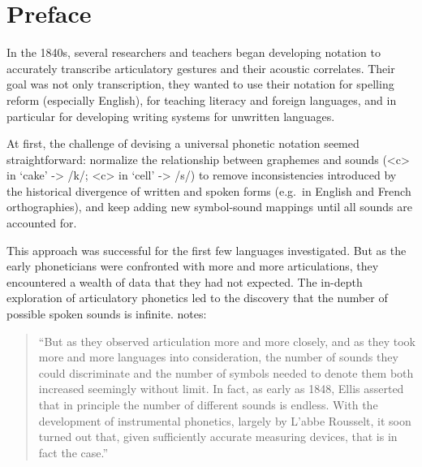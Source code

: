 \chapter{Preface}
\label{preface}



In the 1840s, several researchers and teachers began developing notation to accurately transcribe articulatory gestures and their acoustic correlates. Their goal was not only transcription, they wanted to use their notation for spelling reform (especially English), for teaching literacy and foreign languages, and in particular for developing writing systems for unwritten languages.

At first, the challenge of devising a universal phonetic notation seemed straightforward: normalize the relationship between graphemes and sounds (<c> in `cake' -> /k/; <c> in `cell' -> /s/) to remove inconsistencies introduced by the historical divergence of written and spoken forms (e.g.\ in English and French orthographies), and keep adding new symbol-sound mappings until all sounds are accounted for.


This approach was successful for the first few languages investigated. But as the early phoneticians were confronted with more and more articulations, they encountered a wealth of data that they had not expected. The in-depth exploration of articulatory phonetics led to the discovery that the number of possible spoken sounds is infinite. \cite{Hockett1995} notes:

\begin{quote}
``But as they observed articulation more and more closely, and as they took more and more languages into consideration, the number of sounds they could discriminate and the number of symbols needed to denote them both increased seemingly without limit. In fact, as early as 1848, Ellis asserted that in principle the number of different sounds is endless. With the development of instrumental phonetics, largely by L'abbe Rousselt, it soon turned out that, given sufficiently accurate measuring devices, that is in fact the case.''
\end{quote}

